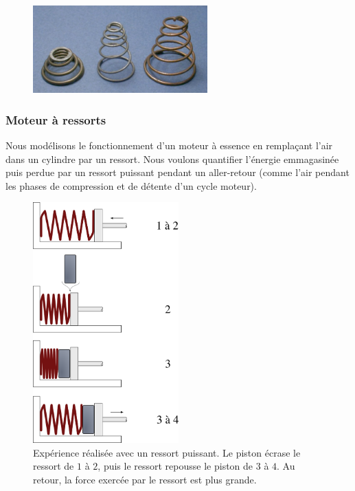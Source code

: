 	\begin{figure}
		\begin{center}
			\includegraphics[width=0.6\textwidth]{images/ressorts_coniques.jpg}
		\end{center}
		\label{fig_ressorts_coniques}
	\end{figure}
	

\subsubsection{Moteur à ressorts}
\label{exo_ressorts_moteur}

	
	Nous modélisons le fonctionnement d’un moteur à essence en remplaçant l’air dans un cylindre par un ressort. Nous voulons quantifier l’énergie emmagasinée puis perdue par un ressort puissant pendant un aller-retour (comme l’air pendant les phases de compression et de détente d’un cycle moteur).

	\begin{figure}
	\begin{center}
		\includegraphics[width=0.5\textwidth]{images/piston_ressorts.png}
	\end{center}
	\caption{Expérience réalisée avec un ressort puissant. Le piston écrase le ressort de $1$ à $2$, puis le ressort repousse le piston de $3$ à $4$. Au retour, la force exercée par le ressort est plus grande.}
	\label{fig_pistons_ressorts}
	\end{figure}

